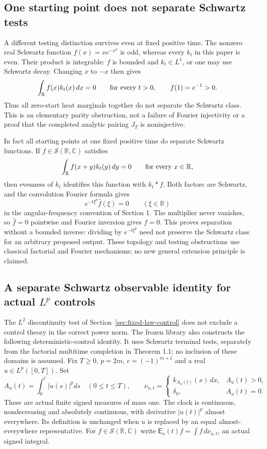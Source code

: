 \documentclass[11pt]{article}
\theoremstyle{remark}\newtheorem{remark}[theorem]{Remark}
\newcommand{\R}{\mathbb R}\newcommand{\N}{\mathbb N}
\begin{document}
\subsection{One starting point does not separate Schwartz tests}
A different testing distinction survives even at fixed positive time.
The nonzero real Schwartz function $f(x)=xe^{-x^2}$ is odd, whereas
every $k_t$ in this paper is even. Their product is integrable:
$f$ is bounded and $k_t\in L^1$, or one may use Schwartz decay.
Changing $x$ to $-x$ then gives
\[
 \int_\R f(x)k_t(x)\,dx=0\qquad\hbox{for every }t>0,
 \qquad f(1)=e^{-1}>0.
\]
Thus all zero-start heat marginals together do not separate the
Schwartz class. This is an elementary parity obstruction, not a
failure of Fourier injectivity or a proof that the completed
analytic pairing $J_T$ is noninjective.

In fact all starting points at one fixed positive time do separate
Schwartz functions. If $f\in\mathcal S(\R,\mathbb C)$ satisfies
\[
 \int_\R f(x+y)k_t(y)\,dy=0\qquad\hbox{for every }x\in\R,
\]
then evenness of $k_t$ identifies this function with $k_t*f$.
Both factors are Schwartz, and the convolution Fourier formula gives
\[
 e^{-t\xi^p}\widehat f(\xi)=0\qquad(\xi\in\R)
\]
in the angular-frequency convention of Section 1. The multiplier
never vanishes, so $\widehat f=0$ pointwise and Fourier inversion
gives $f=0$. This proves separation without a bounded inverse:
dividing by $e^{-t\xi^p}$ need not preserve the Schwartz class
for an arbitrary proposed output. These topology and testing
obstructions use classical factorial and Fourier mechanisms; no
new general extension principle is claimed.

\subsection{A separate Schwartz observable identity for actual $L^p$ controls}
The $L^2$ discontinuity test of Section~\ref{sec:fixed-law-control} does not exclude a
control theory in the correct power norm. The frozen library also
constructs the following deterministic-control identity. It uses
Schwartz terminal tests, separately from the factorial multitime
completion in Theorem 1.1; no inclusion of these domains is assumed.
Fix $T\geq0$, $p=2m$, $c=(-1)^{m+1}$ and a real
$u\in L^p([0,T])$. Set
\[
 A_u(t)=\int_0^t|u(s)|^pds\quad(0\leq t\leq T),\qquad
 \nu_{u,t}=\begin{cases}k_{A_u(t)}(x)\,dx,&A_u(t)>0,\\
                         \delta_0,&A_u(t)=0.
             \end{cases}
\]
These are actual finite signed measures of mass one. The clock is
continuous, nondecreasing and absolutely continuous, with derivative
$|u(t)|^p$ almost everywhere. Its definition is unchanged when $u$
is replaced by an equal almost-everywhere representative.
For $f\in\mathcal S(\R,\mathbb C)$ write
$\mathsf E_u(t)f=\int f\,d\nu_{u,t}$, an actual signed integral.
\end{document}
